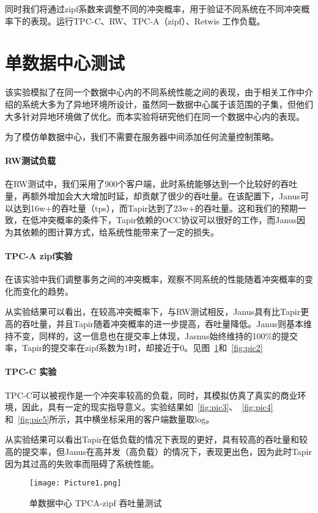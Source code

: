 同时我们将通过zipf系数来调整不同的冲突概率，用于验证不同系统在不同冲突概率下的表现。运行TPC-C\cite{TPCC}、RW、TPC-A（zipf）\cite{TPCA}、Retwis 工作负载。
\section{单数据中心测试}
该实验模拟了在同一个数据中心内的不同系统性能之间的表现，由于相关工作中介绍的系统大多为了异地环境所设计，虽然同一数据中心属于该范围的子集，但他们大多针对异地环境做了优化。而本实验将研究他们在同一个数据中心内的表现。

为了模仿单数据中心，我们不需要在服务器中间添加任何流量控制策略。

\paragraph{RW测试负载}
在RW测试中，我们采用了900个客户端，此时系统能够达到一个比较好的吞吐量，再额外增加会大大增加时延，却贡献了很少的吞吐量。在该配置下，Janus可以达到16w+的吞吐量（tps），而Tapir达到了23w+的吞吐量。这和我们的预期一致，在低冲突概率的条件下，Tapir依赖的OCC协议可以很好的工作，而Janus因为其依赖的图计算方式，给系统性能带来了一定的损失。

\paragraph{TPC-A zipf实验}
在该实验中我们调整事务之间的冲突概率，观察不同系统的性能随着冲突概率的变化而变化的趋势。

从实验结果可以看出，在较高冲突概率下，与RW测试相反，Janus具有比Tapir更高的吞吐量，并且Tapir随着冲突概率的进一步提高，吞吐量降低。Janus则基本维持不变，同样的，这一信息也在提交率上体现，Jasnus始终维持的100\%的提交率，Tapir的提交率在zipf系数为1时，却接近于0。见图~\ref{fig:pic1}和~\ref{fig:pic2}


\paragraph{TPC-C 实验}
TPC-C可以被视作是一个冲突率较高的负载，同时，其模拟仿真了真实的商业环境，因此，具有一定的现实指导意义。实验结果如~\ref{fig:pic3}、~\ref{fig:pic4}和~\ref{fig:pic5}所示，其中横坐标采用的客户端数量取log。

从实验结果可以看出Tapir在低负载的情况下表现的更好，具有较高的吞吐量和较高的提交率，但Janus在高并发（高负载）的情况下，表现更出色，因为此时Tapir因为其过高的失败率而阻碍了系统性能。

\begin{figure}[htb]
  \centering
  \texttt{[image: Picture1.png]}
  \caption{单数据中心 TPCA-zipf 吞吐量测试}
  \label{fig:pic1}
\end{figure}



